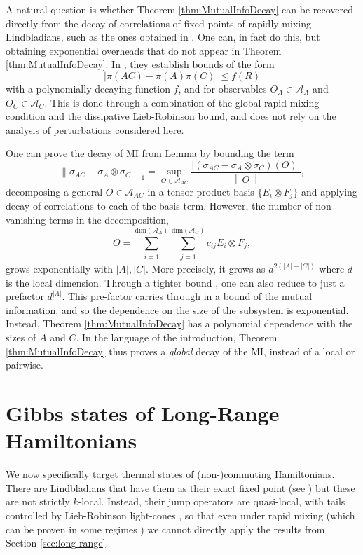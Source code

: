 \documentclass[11pt]{article}
\numberwithin{equation}{section}
\numberwithin{figure}{section}
\numberwithin{table}{section}
\theoremstyle{definition}
\theoremstyle{plain}
\theoremstyle{remark}
\newcommand{\A}{\mathcal{A}}
\newcommand{\norm}[1]{\left\lVert#1\right\rVert}
\newcommand{\normm}[2]{\left\lVert#1\right\rVert_{#2}}
\newcommand{\summ}[1]{\sum\limits_{\substack{ #1 }}}
\newcommand{\abs}[1]{\left \vert#1\right\vert}
\begin{document}
A natural question is whether Theorem \ref{thm:MutualInfoDecay} can be recovered directly from the decay of correlations of fixed points of rapidly-mixing Lindbladians, such as the ones obtained in \cite{cubitt_stability_2015,roon_quasi-locality_2024}. One can, in fact do this, but obtaining exponential overheads that do not appear in Theorem \ref{thm:MutualInfoDecay}.
In \cite{roon_quasi-locality_2024}, they establish bounds of the form\[\abs{\pi(AC)-\pi(A)\pi(C)}\leq f(R)\]with a polynomially decaying function $f$, and for observables $O_A\in\A_A$ and $O_C\in\A_C$. This is done through a combination of the global rapid mixing condition and the dissipative Lieb-Robinson bound, and does not rely on the analysis of perturbations considered here. 

One can prove the decay of MI from Lemma by bounding the term
\begin{equation}
    \normm{\sigma_{AC}-\sigma_A\otimes\sigma_C}{1}=\sup_{O\in\A_{AC}}\dfrac{\abs{(\sigma_{AC}-\sigma_A\otimes\sigma_C)(O)}}{\norm{O}},
\end{equation}
decomposing a general $O\in\A_{AC}$ in a tensor product basis $\{E_i\otimes F_j\}$ and applying decay of correlations to each of the basis term.
However, the number of non-vanishing terms in the decomposition,\[O=\summ{i=1}^{\text{dim}(\A_A)}\summ{j=1}^{\text{dim}(\A_C)}c_{ij}E_i\otimes F_j,\]grows exponentially with $\abs{A},\abs{C}$. More precisely, it grows as $d^{2(\abs{A}+\abs{C})}$ where $d$ is the local dimension. Through a tighter bound \cite{Correa_2022}, one can also reduce to just a prefactor $d^{\abs{A}}$.
This pre-factor carries through in a bound of the mutual information, and so the dependence on the size of the subsystem is exponential.
Instead, Theorem \ref{thm:MutualInfoDecay} has a polynomial dependence with the sizes of $A$ and $C$. In the language of the introduction, Theorem \ref{thm:MutualInfoDecay} thus proves a \emph{global} decay of the MI, instead of a local or pairwise. 


\section{Gibbs states of Long-Range Hamiltonians}\label{sec:thermal}


We now specifically target thermal states of (non-)commuting Hamiltonians. There are Lindbladians that have them as their exact fixed point (see \cite{chen_efficient_2023,Ding_2025}) but these are not strictly $k$-local. Instead, their jump operators are quasi-local, with tails controlled by Lieb-Robinson light-cones \cite{rouze_efficient_2025}, so that even under rapid mixing (which can be proven in some regimes \cite{rouze_optimal_2024,bakshi_dobrushin_2025,smíd2026rapidmixingquantumgibbs}) we cannot directly apply the results from Section \ref{sec:long-range}.
\end{document}
